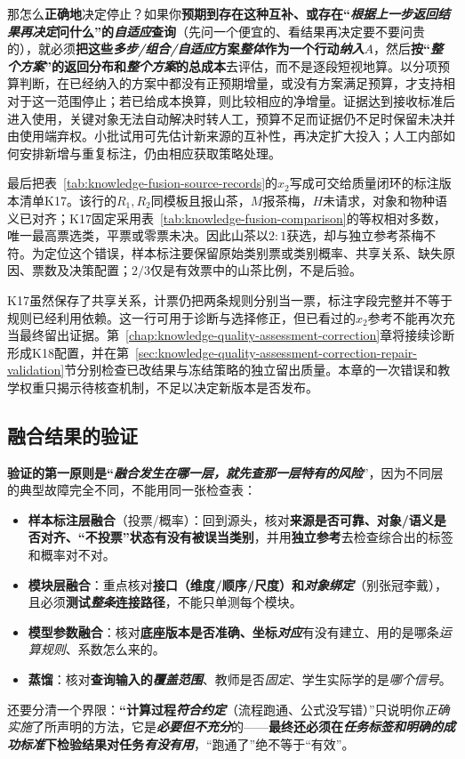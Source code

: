 那怎么\textbf{正确地}决定停止？如果你\textbf{预期到存在这种互补、或存在“\emph{根据上一步返回结果}\emph{再决定}问什么”的\emph{自适应}查询}（先问一个便宜的、看结果再决定要不要问贵的），就必须\textbf{把这些\emph{多步/组合/自适应}方案\emph{整体}作为一个行动\emph{纳入}$A$}，然后\textbf{按“\emph{整个方案}”的返回分布和\emph{整个方案}的总成本}去评估，而不是逐段短视地算。以分项预算判断，在已经纳入的方案中都没有正预期增量，或没有方案满足预算，才支持相对于这一范围停止；若已给成本换算，则比较相应的净增量。证据达到接收标准后进入使用，关键对象无法自动解决时转人工，预算不足而证据仍不足时保留未决并由使用端弃权。小批试用可先估计新来源的互补性，再决定扩大投入；人工内部如何安排新增与重复标注，仍由相应获取策略处理。

最后把表~\ref{tab:knowledge-fusion-source-records}的$x_2$写成可交给质量闭环的标注版本清单K17。该行的$R_1,R_2$同模板且报山茶，$M$报茶梅，$H$未请求，对象和物种语义已对齐；K17固定采用表~\ref{tab:knowledge-fusion-comparison}的等权相对多数，唯一最高票选类，平票或零票未决。因此山茶以$2:1$获选，却与独立参考茶梅不符。为定位这个错误，样本标注要保留原始类别票或类别概率、共享关系、缺失原因、票数及决策配置；$2/3$仅是有效票中的山茶比例，不是后验。

K17虽然保存了共享关系，计票仍把两条规则分别当一票，标注字段完整并不等于规则已经利用依赖。这一行可用于诊断与选择修正，但已看过的$x_2$参考不能再次充当最终留出证据。第~\ref{chap:knowledge-quality-assessment-correction}章将接续诊断形成K18配置，并在第~\ref{sec:knowledge-quality-assessment-correction-repair-validation}节分别检查已改结果与冻结策略的独立留出质量。本章的一次错误和教学权重只揭示待核查机制，不足以决定新版本是否发布。

\subsection{融合结果的验证}
\label{sec:knowledge-fusion-validation}

\textbf{验证的第一原则是“\emph{融合发生在\emph{哪一层}，就先查那一层特有的风险}}”，因为不同层的典型故障完全不同，不能用同一张检查表：
\begin{itemize}\item \textbf{样本标注层融合}（投票/概率）：回到源头，核对\textbf{来源是否可靠、对象/语义是否对齐、“不投票”状态有没有被误当类别}，并用\textbf{独立参考}去检查综合出的标签和概率对不对。\item \textbf{模块层融合}：重点核对\textbf{接口（维度/顺序/尺度）和\emph{对象绑定}}（别张冠李戴），且必须\textbf{测试\emph{整条}连接路径}，不能只单测每个模块。\item \textbf{模型参数融合}：核对\textbf{底座版本是否准确、坐标\emph{对应}}有没有建立、用的是哪条\emph{运算规则}、系数怎么来的。\item \textbf{蒸馏}：核对\textbf{查询输入的\emph{覆盖范围}}、教师是否\emph{固定}、学生实际学的是\emph{哪个信号}。\end{itemize}
还要分清一个界限：\textbf{“计算过程\emph{符合约定}}（流程跑通、公式没写错）”只说明你\emph{正确实施}了所声明的方法，它是\textbf{\emph{必要但不充分}}的——\textbf{最终还必须在\emph{任务标签和明确的成功标准}下检验结果对任务\emph{有没有用}}，“跑通了”绝不等于“有效”。

